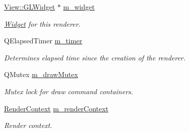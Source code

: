 \begin{Indent}
\begin{DoxyCompactItemize}
\mbox{\label{classrev_1_1_main_renderer_a261643750032e4f7e21ae48b84c870b1}} 
\mbox{\hyperlink{classrev_1_1_view_1_1_g_l_widget}{View\+::\+G\+L\+Widget}} $\ast$ \mbox{\hyperlink{classrev_1_1_main_renderer_a261643750032e4f7e21ae48b84c870b1}{m\+\_\+widget}}
\begin{DoxyCompactList}\small\item\em \mbox{\hyperlink{class_widget}{Widget}} for this renderer. \end{DoxyCompactList}\item 
\mbox{\label{classrev_1_1_main_renderer_a9ec998f471fc3f2cabf1b00c1551e0b2}} 
Q\+Elapsed\+Timer \mbox{\hyperlink{classrev_1_1_main_renderer_a9ec998f471fc3f2cabf1b00c1551e0b2}{m\+\_\+timer}}
\begin{DoxyCompactList}\small\item\em Determines elapsed time since the creation of the renderer. \end{DoxyCompactList}\item 
\mbox{\label{classrev_1_1_main_renderer_a7daf751b7c3d6083653e759de8cfb8c5}} 
Q\+Mutex \mbox{\hyperlink{classrev_1_1_main_renderer_a7daf751b7c3d6083653e759de8cfb8c5}{m\+\_\+draw\+Mutex}}
\begin{DoxyCompactList}\small\item\em Mutex lock for draw command containers. \end{DoxyCompactList}\item 
\mbox{\label{classrev_1_1_main_renderer_afcae954f24adc25fb8802caffd130c22}} 
\mbox{\hyperlink{classrev_1_1_render_context}{Render\+Context}} \mbox{\hyperlink{classrev_1_1_main_renderer_afcae954f24adc25fb8802caffd130c22}{m\+\_\+render\+Context}}
\begin{DoxyCompactList}\small\item\em Render context. \end{DoxyCompactList}\end{DoxyCompactItemize}
\end{Indent}
